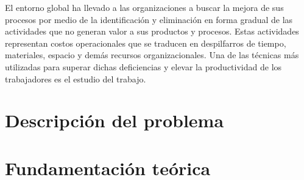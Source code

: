     El entorno global ha llevado a las organizaciones a buscar la mejora de sus procesos por medio de la identificación y eliminación en forma gradual de las actividades que no generan valor a sus productos y procesos. Estas actividades representan costos operacionales que se traducen en despilfarros de tiempo, materiales, espacio y demás recursos organizacionales. Una de las técnicas más utilizadas para superar dichas deficiencias y elevar la productividad de los trabajadores es el estudio del trabajo. \cite{castiblanco2016que}
        
    
    \section{Descripción del problema}
    
    \section{Fundamentación teórica}
    
